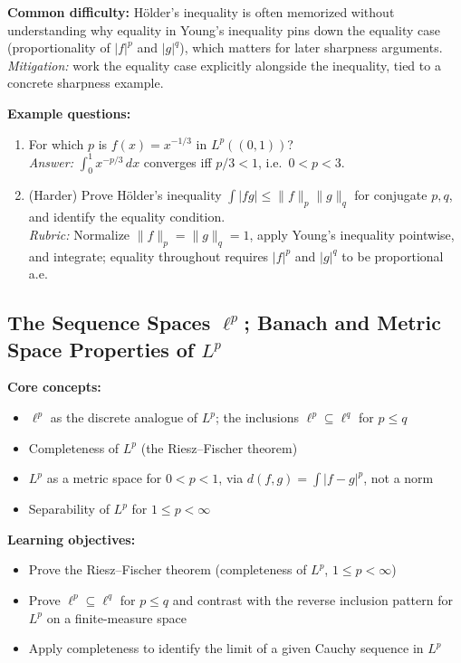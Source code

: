 \documentclass[11pt]{article}
\begin{document}
\textbf{Common difficulty:} H\"older's inequality is often memorized without understanding why equality in Young's inequality pins down the equality case (proportionality of $|f|^p$ and $|g|^q$), which matters for later sharpness arguments. \textit{Mitigation:} work the equality case explicitly alongside the inequality, tied to a concrete sharpness example.

\textbf{Example questions:}
\begin{enumerate}[nosep]
\item For which $p$ is $f(x)=x^{-1/3}$ in $L^p((0,1))$? \\
\textit{Answer:} $\int_0^1 x^{-p/3}\,dx$ converges iff $p/3<1$, i.e.\ $0<p<3$.
\item (Harder) Prove H\"older's inequality $\int|fg|\le\|f\|_p\|g\|_q$ for conjugate $p,q$, and identify the equality condition. \\
\textit{Rubric:} Normalize $\|f\|_p=\|g\|_q=1$, apply Young's inequality pointwise, and integrate; equality throughout requires $|f|^p$ and $|g|^q$ to be proportional a.e.
\end{enumerate}

\subsection{The Sequence Spaces $\ell^p$; Banach and Metric Space Properties of $L^p$}

\textbf{Core concepts:}
\begin{itemize}[nosep]
\item $\ell^p$ as the discrete analogue of $L^p$; the inclusions $\ell^p\subseteq\ell^q$ for $p\le q$
\item Completeness of $L^p$ (the Riesz--Fischer theorem)
\item $L^p$ as a metric space for $0<p<1$, via $d(f,g)=\int|f-g|^p$, not a norm
\item Separability of $L^p$ for $1\le p<\infty$
\end{itemize}

\textbf{Learning objectives:}
\begin{itemize}[nosep]
\item Prove the Riesz--Fischer theorem (completeness of $L^p$, $1\le p<\infty$)
\item Prove $\ell^p\subseteq\ell^q$ for $p\le q$ and contrast with the reverse inclusion pattern for $L^p$ on a finite-measure space
\item Apply completeness to identify the limit of a given Cauchy sequence in $L^p$
\end{itemize}
\end{document}
